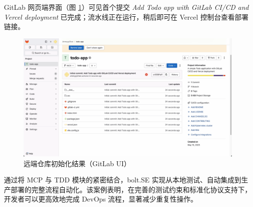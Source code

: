 GitLab 网页端界面（图 \ref{fig:gitlab_repo}）可见首个提交 \textit{Add Todo app with GitLab CI/CD and Vercel deployment} 已完成；流水线正在运行，稍后即可在 Vercel 控制台查看部署链接。

\begin{figure}[H]
  \centering
  \includegraphics[width=\textwidth]{figures/screenshots/ci-cd/gitlab_repo.png}
  \caption{远端仓库初始化结果（GitLab UI）}
  \label{fig:gitlab_repo}
\end{figure}

通过将 MCP 与 TDD 模块的紧密结合，bolt.SE 实现从本地测试、自动集成到生产部署的完整流程自动化。该案例表明，在完善的测试约束和标准化协议支持下，开发者可以更高效地完成 DevOps 流程，显著减少重复性操作。
